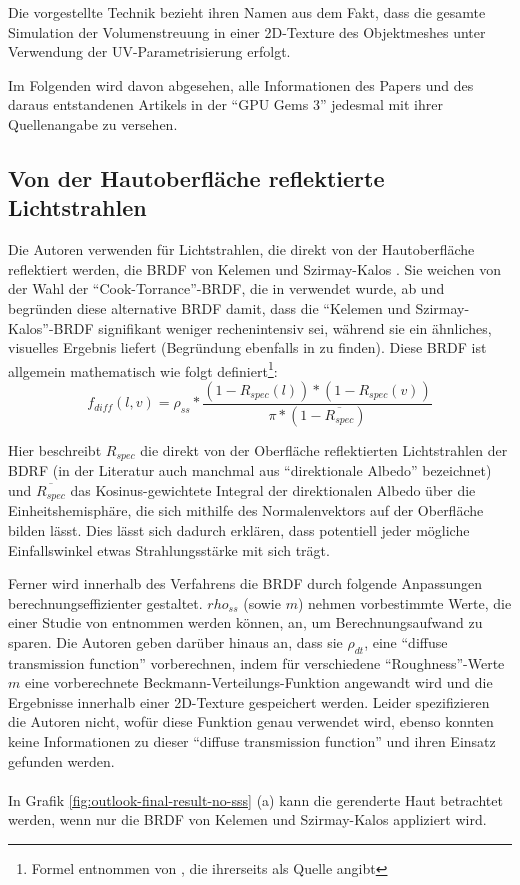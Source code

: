 \documentclass[ngerman,runningheads,a4paper]{llncs}[2018/03/10]
\begin{document}
Die vorgestellte Technik bezieht ihren Namen aus dem Fakt, dass die gesamte Simulation der Volumenstreuung in einer 2D-Texture des Objektmeshes unter Verwendung der UV-Parametrisierung erfolgt.

Im Folgenden wird davon abgesehen, alle Informationen des Papers \cite{efficient-human-skin-rendering} und des daraus entstandenen Artikels in der \enquote{GPU Gems 3} \cite{advanced-realtime-skin-rendering} jedesmal mit ihrer Quellenangabe zu versehen.

\subsection{Von der Hautoberfläche reflektierte Lichtstrahlen}
\label{sub:skin-surface-reflect}

Die Autoren \citeauthor{efficient-human-skin-rendering} verwenden für Lichtstrahlen, die direkt von der Hautoberfläche reflektiert werden, die BRDF von Kelemen und Szirmay-Kalos \cite{kelemen2001microfacet}.
Sie weichen von der Wahl der \enquote{Cook-Torrance}-BRDF, die in \citet{spectral-bssrdf-human-skin} verwendet wurde, ab und begründen diese alternative BRDF damit, dass die \enquote{Kelemen und Szirmay-Kalos}-BRDF signifikant weniger rechenintensiv sei, während sie ein ähnliches, visuelles Ergebnis liefert (Begründung ebenfalls in \cite{hoffman2013background} zu finden).
Diese BRDF ist allgemein mathematisch wie folgt definiert\footnote{Formel entnommen von \cite[p.~352]{real-time-rendering}, die ihrerseits \cite{kelemen2001microfacet} als Quelle angibt}: $$f_{diff}(l, v) = \rho_{ss} * \frac{(1 - R_{spec}(l))* (1 - R_{spec}(v))}{\pi * (1 - \overline{R_{spec}})}$$

Hier beschreibt $R_{spec}$ die direkt von der Oberfläche reflektierten Lichtstrahlen der BDRF (in der Literatur auch manchmal aus \enquote{direktionale Albedo} bezeichnet) und $\overline{R_{spec}}$ das Kosinus-gewichtete Integral der direktionalen Albedo über die Einheitshemisphäre, die sich mithilfe des Normalenvektors auf der Oberfläche bilden lässt.
Dies lässt sich dadurch erklären, dass potentiell jeder mögliche Einfallswinkel etwas Strahlungsstärke mit sich trägt.

Ferner wird innerhalb des Verfahrens die BRDF durch folgende Anpassungen berechnungseffizienter gestaltet.
$rho_{ss}$ (sowie $m$) nehmen vorbestimmte Werte, die einer Studie von \citet{weyrich2006analysis} entnommen werden können, an, um Berechnungsaufwand zu sparen.
Die Autoren geben darüber hinaus an, dass sie $\rho_{dt}$, eine \enquote{diffuse transmission function} vorberechnen, indem für verschiedene \enquote{Roughness}-Werte $m$ eine vorberechnete Beckmann-Verteilungs-Funktion angewandt wird und die Ergebnisse innerhalb einer 2D-Texture gespeichert werden.
Leider spezifizieren die Autoren nicht, wofür diese Funktion genau verwendet wird, ebenso konnten keine Informationen zu dieser \enquote{diffuse transmission function} und ihren Einsatz gefunden werden.
\\
\\
In Grafik \ref{fig:outlook-final-result-no-sss} (a) kann die gerenderte Haut betrachtet werden, wenn nur die BRDF von Kelemen und Szirmay-Kalos appliziert wird.
\end{document}

